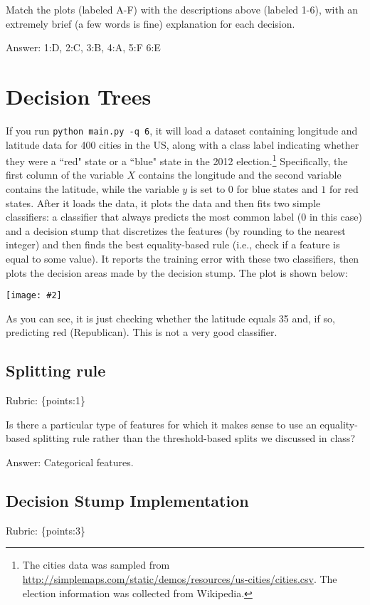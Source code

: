 \documentclass{article}
\def\ans#1{\par\gre{Answer: #1}}
\def\answer#1{\ans{#1}}
\def\rubric#1{\gre{Rubric: \{#1\}}}{}
\def\blu#1{{\color{blu}#1}}
\def\gre#1{{\color{gre}#1}}
\newcommand{\centerfig}[2]{\begin{center}\texttt{[image: \#2]}\end{center}}
\begin{document}
	\blu{Match the plots (labeled A-F) with the descriptions above (labeled 1-6), with an extremely brief (a few words is fine) explanation for each decision.}
	
	\answer{1:D, 2:C, 3:B, 4:A, 5:F 6:E}
	
	
	
	
	\section{Decision Trees}
	
	If you run \texttt{python main.py -q 6}, it will load a dataset containing longitude 
	and latitude data for 400 cities in the US, along with a class label indicating
	whether they were a ``red" state or a ``blue" state in the 2012 
	election.\footnote{The cities data was sampled from \url{http://simplemaps.com/static/demos/resources/us-cities/cities.csv}. The election information was collected from Wikipedia.}
	Specifically, the first column of the variable $X$ contains the 
	longitude and the second variable contains the latitude,
	while the variable $y$ is set to $0$ for blue states and $1$ for red states.
	After it loads the data, it plots the data and then fits two simple 
	classifiers: a classifier that always predicts the
	most common label ($0$ in this case) and a decision stump
	that discretizes the features (by rounding to the nearest integer)
	and then finds the best equality-based rule (i.e., check
	if a feature is equal to some value).
	It reports the training error with these two classifiers, then plots the decision areas made by the decision stump.
	The plot is shown below:
	
	\centerfig{0.7}{../figs/q6_decisionBoundary}
	
	As you can see, it is just checking whether the latitude equals 35 and, if so, predicting red (Republican).
	This is not a very good classifier. 
	
	\subsection{Splitting rule}
	\rubric{points:1}
	
	Is there a particular type of features for which it makes sense to use an equality-based splitting rule rather than the threshold-based splits we discussed in class?
	
	\answer{Categorical features.}
	
	\subsection{Decision Stump Implementation}
	\rubric{points:3}
	
\end{document}
